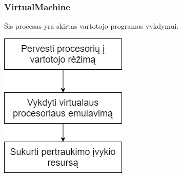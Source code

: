 \documentclass{scrartcl}
\begin{document}
      \subsubsection{VirtualMachine}
        Šis procesas yra skirtas vartotojo programos vykdymui.
        \begin{center}
          \includegraphics[scale=0.5]{VirtualMachine}
        \end{center}
\end{document}
